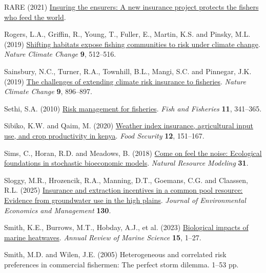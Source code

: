 \documentclass[
  letterpaper,
  DIV=11,
  numbers=noendperiod]{scrartcl}
\newlength{\cslhangindent}
\newenvironment{CSLReferences}[2] %
 {\begin{list}{}{%
  \setlength{\itemindent}{0pt}
  \setlength{\leftmargin}{0pt}
  \setlength{\parsep}{0pt}
  \ifodd #1
   \setlength{\leftmargin}{\cslhangindent}
   \setlength{\itemindent}{-1\cslhangindent}
  \fi
  \setlength{\itemsep}{#2\baselineskip}}}
 {\end{list}}
\theoremstyle{plain}
\theoremstyle{plain}
\theoremstyle{remark}
\begin{document}
\begin{CSLReferences}{1}{0}
RARE (2021)
\href{https://rare.org/stories-articles/insuring-the-ensurers-rares-fish-forever-program-protects-the-fishers-who-feed-the-world/}{Insuring
the ensurers: A new insurance project protects the fishers who feed the
world}.

Rogers, L.A., Griffin, R., Young, T., Fuller, E., Martin, K.S. and
Pinsky, M.L. (2019)
\href{https://doi.org/10.1038/s41558-019-0503-z}{Shifting habitats
expose fishing communities to risk under climate change}. \emph{Nature
Climate Change} \textbf{9}, 512--516.

Sainsbury, N.C., Turner, R.A., Townhill, B.L., Mangi, S.C. and Pinnegar,
J.K. (2019) \href{https://doi.org/10.1038/s41558-019-0645-z}{The
challenges of extending climate risk insurance to fisheries}.
\emph{Nature Climate Change} \textbf{9}, 896--897.

Sethi, S.A. (2010)
\href{https://doi.org/10.1111/j.1467-2979.2010.00363.x}{Risk management
for fisheries}. \emph{Fish and Fisheries} \textbf{11}, 341--365.

Sibiko, K.W. and Qaim, M. (2020)
\href{https://doi.org/10.1007/s12571-019-00987-y}{Weather index
insurance, agricultural input use, and crop productivity in kenya}.
\emph{Food Security} \textbf{12}, 151--167.

Sims, C., Horan, R.D. and Meadows, B. (2018)
\href{https://doi.org/10.1111/NRM.12191}{Come on feel the noise:
Ecological foundations in stochastic bioeconomic models}. \emph{Natural
Resource Modeling} \textbf{31}.

Sloggy, M.R., Hrozencik, R.A., Manning, D.T., Goemans, C.G. and
Claassen, R.L. (2025)
\href{https://doi.org/10.1016/j.jeem.2025.103125}{Insurance and
extraction incentives in a common pool resource: Evidence from
groundwater use in the high plains}. \emph{Journal of Environmental
Economics and Management} \textbf{130}.

Smith, K.E., Burrows, M.T., Hobday, A.J., et al. (2023)
\href{https://doi.org/10.1146/annurev-marine-032122-121437}{Biological
impacts of marine heatwaves}. \emph{Annual Review of Marine Science}
\textbf{15}, 1--27.

Smith, M.D. and Wilen, J.E. (2005) Heterogeneous and correlated risk
preferences in commercial fishermen: The perfect storm dilemma. 1--53
pp.


\end{CSLReferences}
\end{document}
